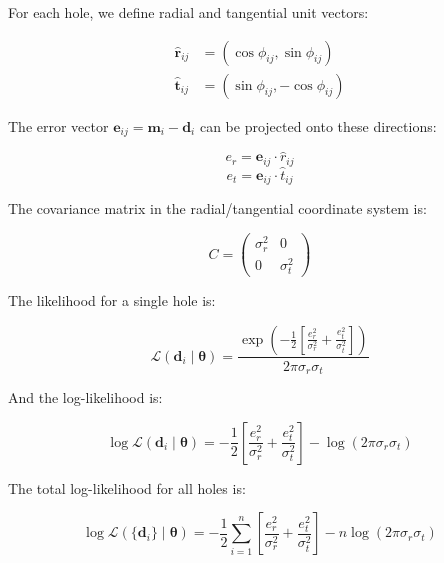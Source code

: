 \documentclass[11pt]{article}
\begin{document}
For each hole, we define radial and tangential unit vectors:

\begin{equation}
\label{eq:r_t_unit}
\begin{aligned}
    \hat{\mathbf{r}}_{ij} &= (\cos\phi_{ij}, \sin\phi_{ij}) \\
    \hat{\mathbf{t}}_{ij} &= (\sin\phi_{ij}, -\cos\phi_{ij})
\end{aligned}
\end{equation}

The error vector $\mathbf{e}_{ij} = \mathbf{m}_i - \mathbf{d}_i$ can be projected onto these directions:

$$e_r = \mathbf{e}_{ij} \cdot \hat{r}_{ij}$$
$$e_t = \mathbf{e}_{ij} \cdot \hat{t}_{ij}$$

The covariance matrix in the radial/tangential coordinate system is:

$$C = \begin{pmatrix} \sigma_r^2 & 0 \\ 0 & \sigma_t^2 \end{pmatrix}$$

The likelihood for a single hole is:

$$\mathcal{L}(\mathbf{d}_i \mid \boldsymbol{\theta}) = \frac{\exp \left(-\frac{1}{2}\left[\frac{e_r^2}{\sigma_r^2} + \frac{e_t^2}{\sigma_t^2}\right]\right)}{2\pi\sigma_r\sigma_t}$$

And the log-likelihood is:

$$\log \mathcal{L}(\mathbf{d}_i \mid \boldsymbol{\theta}) = -\frac{1}{2}\left[\frac{e_r^2}{\sigma_r^2} + \frac{e_t^2}{\sigma_t^2}\right] - \log(2\pi\sigma_r\sigma_t)$$

The total log-likelihood for all holes is:

\begin{equation}
\label{eq:ml_rt}
    \log \mathcal{L}(\{\mathbf{d}_i\} \mid \boldsymbol{\theta}) = -\frac{1}{2}\sum_{i=1}^{n}\left[\frac{e_r^2}{\sigma_r^2} + \frac{e_t^2}{\sigma_t^2}\right] - n\log(2\pi\sigma_r\sigma_t)
\end{equation}
\end{document}
